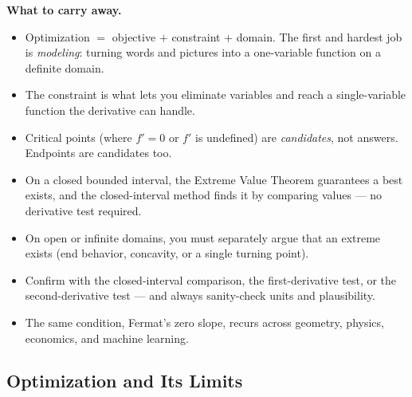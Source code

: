 \begin{focusbox}
\textbf{What to carry away.}
\begin{itemize}
  \item Optimization $=$ objective $+$ constraint $+$ domain. The first and hardest
    job is \emph{modeling}: turning words and pictures into a one-variable function
    on a definite domain.
  \item The constraint is what lets you eliminate variables and
    reach a single-variable function the derivative can handle.
  \item Critical points (where $f'=0$ or $f'$ is undefined) are \emph{candidates},
    not answers. Endpoints are candidates too.
  \item On a closed bounded interval, the Extreme Value Theorem guarantees a best
    exists, and the closed-interval method finds it by comparing values --- no
    derivative test required.
  \item On open or infinite domains, you must separately argue that an extreme exists
    (end behavior, concavity, or a single turning point).
  \item Confirm with the closed-interval comparison, the first-derivative test, or
    the second-derivative test --- and always sanity-check units and plausibility.
  \item The same condition, Fermat's zero slope, recurs across
    geometry, physics, economics, and machine learning.
\end{itemize}
\end{focusbox}

\subsection{Optimization and Its Limits}
\label{ch17:what-unlocked}

